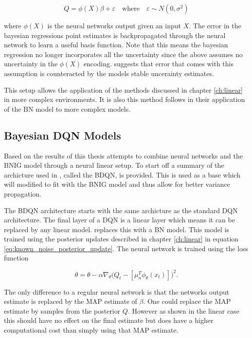 \begin{equation*}
	Q = \phi(X)\beta + \varepsilon \quad \text{where} \quad \varepsilon \sim N(0,\sigma^2)
\end{equation*}

where $\phi(X)$ is the neural networks output given an input $X$. The error in the bayesian regressions point estimates is backpropagated through the neural network to learn a useful basis function. Note that this means the bayesian regression no longer incorporates all the uncertainty since the above assumes no uncertainty in the $\phi(X)$ encoding. \cite{carlos_2018} suggests that error that comes with this assumption is counteracted by the models stable uncerainty estimates.

This setup allows the application of the methods discussed in chapter \ref{ch:linear} in more complex environments. It is also this method \cite{azziz_2018} follows in their application of the BN model to more complex models.

\subsection{Bayesian DQN Models}

Based on the results of \cite{carlos_2018} this thesis attempts to combine neural networks and the BNIG model through a neural linear setup. To start off a summary of the archicture used in \cite{azziz_2018}, called the BDQN, is provided. This is used as a base which will modified to fit with the BNIG model and thus allow for better variance propagation.

The BDQN architecture starts with the same archicture as the standard DQN architecture\citep{mnih_2015}. The final layer of a DQN is a linear layer which means it can be replaced by any linear model. \cite{azziz_2018} replaces this with a BN model. This model is trained using the posterior updates described in chapter \ref{ch:linear} in equation \ref{eq:known_noise_posterior_update}. The neural network is trained using the loss function

\begin{equation*}
	\theta = \theta - \alpha\nabla_\theta\big(Q_t - [\mu_n^T\phi_\theta(x_t)]\big)^2.
\end{equation*}

The only difference to a regular neural network is that the networks output estimate is replaced by the MAP estimate of $\beta$. One could replace the MAP estimate by samples from the posterior $Q$. However as shown in the linear case this should have no effect on the final estimate but does have a higher computational cost than simply using that MAP estimate.

